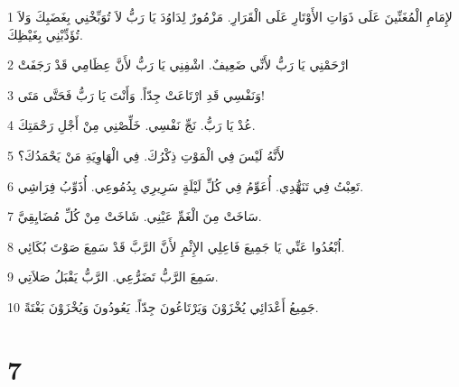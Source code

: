 \par 1 لإِمَامِ الْمُغَنِّينَ عَلَى ذَوَاتِ الأَوْتَارِ عَلَى الْقَرَارِ. مَزْمُورٌ لِدَاوُدَ يَا رَبُّ لاَ تُوَبِّخْنِي بِغَضَبِكَ وَلاَ تُؤَدِّبْنِي بِغَيْظِكَ.
\par 2 ارْحَمْنِي يَا رَبُّ لأَنِّي ضَعِيفٌ. اشْفِنِي يَا رَبُّ لأَنَّ عِظَامِي قَدْ رَجَفَتْ
\par 3 وَنَفْسِي قَدِ ارْتَاعَتْ جِدّاً. وَأَنْتَ يَا رَبُّ فَحَتَّى مَتَى!
\par 4 عُدْ يَا رَبُّ. نَجِّ نَفْسِي. خَلِّصْنِي مِنْ أَجْلِ رَحْمَتِكَ.
\par 5 لأَنَّهُ لَيْسَ فِي الْمَوْتِ ذِكْرُكَ. فِي الْهَاوِيَةِ مَنْ يَحْمَدُكَ؟
\par 6 تَعِبْتُ فِي تَنَهُّدِي. أُعَوِّمُ فِي كُلِّ لَيْلَةٍ سَرِيرِي بِدُمُوعِي. أُذَوِّبُ فِرَاشِي.
\par 7 سَاخَتْ مِنَ الْغَمِّ عَيْنِي. شَاخَتْ مِنْ كُلِّ مُضَايِقِيَّ.
\par 8 اُبْعُدُوا عَنِّي يَا جَمِيعَ فَاعِلِي الإِثْمِ لأَنَّ الرَّبَّ قَدْ سَمِعَ صَوْتَ بُكَائِي.
\par 9 سَمِعَ الرَّبُّ تَضَرُّعِي. الرَّبُّ يَقْبَلُ صَلاَتِي.
\par 10 جَمِيعُ أَعْدَائِي يُخْزَوْنَ وَيَرْتَاعُونَ جِدّاً. يَعُودُونَ وَيُخْزَوْنَ بَغْتَةً.

\chapter{7}

